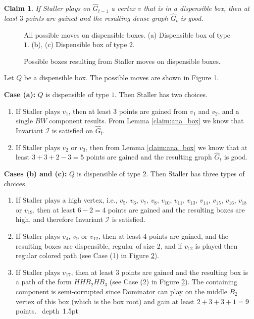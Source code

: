 \documentclass[11pt]{article}
\def\Proof{\par\noindent{\bf Proof:~}}
\def\blackslug{\hbox{\hskip 1pt \vrule width 4pt height 8pt
    depth 1.5pt \hskip 1pt}}
\def\QED{\quad\blackslug\lower 8.5pt\null\par}
\def\dnsitem{\vspace{-7pt}\item}
\newtheorem{claim}[theorem]{Claim}
\theoremstyle{definition}
\def\invboxes{\mathcal{I}}
\begin{document}
\begin{claim}
\label{claim:staller_dispensible}
If Staller plays on $\hat{G}_{t-1}$ a vertex $v$ that is in a dispensible box, then at least $3$ points are gained and the resulting dense graph $\hat{G}_t$ is good.
\end{claim}
\begin{figure}[thbp]
  \caption{\sf All possible moves on dispensible boxes.
		(a) Dispensible box of type $1$.
		(b), (c) Dispensible box of type $2$.}
  \medskip
  \centering
  \label{fig:dispensible_staller}
\end{figure}

\begin{figure}[hbtp]
  \caption{\sf Possible boxes resulting from Staller moves on dispensible boxes.}
  \medskip
  \centering
  \label{fig:dispensible_staller_sc}
\end{figure}
\Proof

Let $Q$ be a dispensible box.
The possible moves are shown in Figure \ref{fig:dispensible_staller}.

\smallskip
\par\noindent
{\bf Case (a):}
$Q$ is dispensible of type $1$.
Then Staller has two choices.
\begin{enumerate}
	\dnsitem If Staller plays $v_1$, then at least $3$ points are gained from $v_1$ and $v_2$, and a single $BW$ component results. From Lemma \ref{claim:ana_box} we know that Invariant $\invboxes$ is satisfied on $\hat{G}_t$. 
	\dnsitem If Staller plays $v_2$ or $v_3$, then from Lemma \ref{claim:ana_box} we know that at least $3 + 3 + 2 - 3 = 5$ points are gained and the resulting graph $\hat{G}_t$ is good.
\end{enumerate}

\smallskip
\par\noindent
{\bf Cases (b) and (c):}
$Q$ is dispensible of type $2$.
Then Staller has three types of choices.
\begin{enumerate}
	\dnsitem If Staller plays a high vertex, i.e., $v_5$, $v_6$, $v_7$, $v_8$, $v_{10}$, $v_{11}$, $v_{13}$, $v_{14}$, $v_{15}$, $v_{16}$, $v_{18}$ or $v_{19}$,
	then at least $6 - 2 = 4$ points are gained and the resulting boxes are high, and therefore Invariant $\invboxes$ is satisfied.
	\dnsitem If Staller plays $v_4$, $v_9$ or $v_{12}$, then at least $4$ points are gained, and the resulting boxes are dispensible, regular of size $2$, and if $v_{12}$ is played then regular colored path (see Case (1) in Figure \ref{fig:dispensible_staller_sc}).
	\dnsitem If Staller plays $v_{17}$, then at least $3$ points are gained and the resulting box is a path of the form $HHB_2HB_3$ (see Case (2) in Figure \ref{fig:dispensible_staller_sc}). The containing component is semi-corrupted since Dominator can play on the middle $B_2$ vertex of this box (which is the box root) and gain at least $2 + 3 + 3 + 1 = 9$ points. 
\QED
\end{enumerate}
\end{document}
